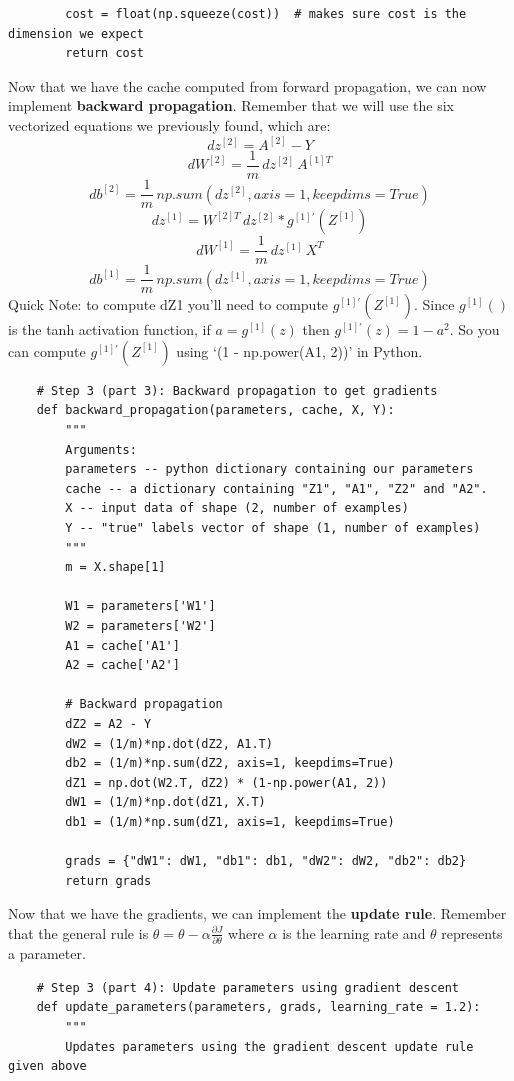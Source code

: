\documentclass[11pt, a4paper]{article}
\begin{document}
\begin{spacing}{1.1}
\begin{lstlisting}
		cost = float(np.squeeze(cost))  # makes sure cost is the dimension we expect
		return cost \end{lstlisting} \vspace*{1mm}
	Now that we have the cache computed from forward propagation, we can now implement \textbf{backward propagation}. Remember that we will use the six vectorized equations we previously found, which are: \vspace*{1mm} \\
	$$dz^{[2]} = A^{[2]} - Y$$ 
	$$dW^{[2]} = \frac{1}{m}\, dz^{[2]}\,A^{[1]T}$$
	$$db^{[2]} = \frac{1}{m}\, np.sum(dz^{[2]}, axis=1, keepdims=True)$$ 
	$$dz^{[1]} = W^{[2]T}\,dz^{[2]} * g^{[1]'}(Z^{[1]})$$ 
	$$dW^{[1]} = \frac{1}{m}\, dz^{[1]}\,X^{T}$$
	$$db^{[1]} = \frac{1}{m}\, np.sum(dz^{[1]}, axis=1, keepdims=True)$$
	Quick Note: to compute dZ1 you'll need to compute $g^{[1]'}(Z^{[1]})$. Since $g^{[1]}()$ is the tanh activation function, if $a = g^{[1]}(z)$ then $g^{[1]'}(z) = 1-a^2$. So you can compute $g^{[1]'}(Z^{[1]})$ using `(1 - np.power(A1, 2))' in Python. \newpage

	\begin{lstlisting}
	# Step 3 (part 3): Backward propagation to get gradients
	def backward_propagation(parameters, cache, X, Y):
		"""
		Arguments:
		parameters -- python dictionary containing our parameters 
		cache -- a dictionary containing "Z1", "A1", "Z2" and "A2".
		X -- input data of shape (2, number of examples)
		Y -- "true" labels vector of shape (1, number of examples)
		"""
		m = X.shape[1]

		W1 = parameters['W1']
		W2 = parameters['W2']
		A1 = cache['A1']
		A2 = cache['A2']
		
		# Backward propagation
		dZ2 = A2 - Y
		dW2 = (1/m)*np.dot(dZ2, A1.T)
		db2 = (1/m)*np.sum(dZ2, axis=1, keepdims=True)
		dZ1 = np.dot(W2.T, dZ2) * (1-np.power(A1, 2))
		dW1 = (1/m)*np.dot(dZ1, X.T)
		db1 = (1/m)*np.sum(dZ1, axis=1, keepdims=True)
		
		grads = {"dW1": dW1, "db1": db1, "dW2": dW2, "db2": db2}
		return grads \end{lstlisting}
	Now that we have the gradients, we can implement the \textbf{update rule}. Remember that the general rule is $ \theta = \theta - \alpha \frac{\partial J }{ \partial \theta }$ where $\alpha$ is the learning rate and $\theta$ represents a parameter.
	\begin{lstlisting}
	# Step 3 (part 4): Update parameters using gradient descent
	def update_parameters(parameters, grads, learning_rate = 1.2):
		"""
		Updates parameters using the gradient descent update rule given above
		

\end{lstlisting}
\end{spacing}
\end{document}
